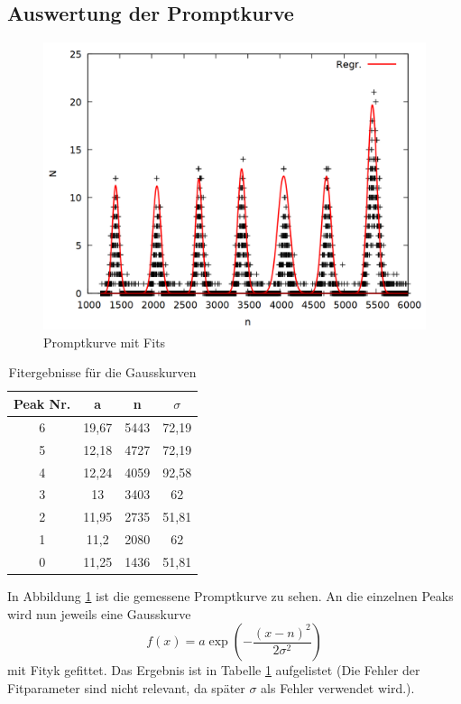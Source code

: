\subsection{Auswertung der Promptkurve}


\begin{figure}
\centering
\includegraphics[width=0.7\linewidth]{data/prompt2.png}
\caption{Promptkurve mit Fits}
\label{fig:prompt2}
\end{figure}

\begin{table}
\centering
\caption{Fitergebnisse für die Gausskurven}
\begin{tabular}{cccc}
\toprule
Peak Nr. & a & n & $\sigma$\\
\midrule
6&	19,67&	5443&	72,19\\
5&	12,18&	4727&	72,19\\
4&	12,24&	4059&	92,58\\
3&	13&	3403&	62\\
2&	11,95&	2735&	51,81\\
1&	11,2&	2080&	62\\
0&	11,25&	1436&	51,81\\
\bottomrule
\end{tabular}
\label{tab:prompt}
\end{table}

In Abbildung \ref{fig:prompt2} ist die gemessene Promptkurve zu sehen. An die einzelnen Peaks wird nun jeweils eine Gausskurve \[f(x) = a\exp{\left(-\frac{(x-n)^2}{2\sigma^2}\right)}\]mit Fityk gefittet. Das Ergebnis ist in Tabelle \ref{tab:prompt} aufgelistet (Die Fehler der Fitparameter sind nicht relevant, da später $\sigma$ als Fehler verwendet wird.).\\

